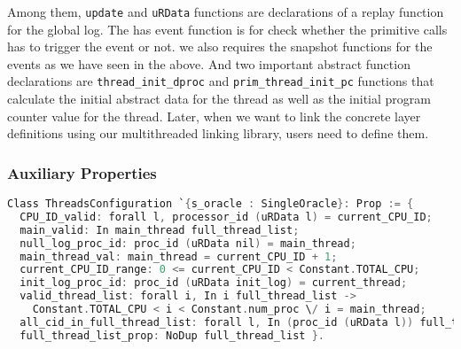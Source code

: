 Among them,  \lstinline$update$ and \lstinline$uRData$ functions are  declarations of a replay function for the global log. 
The has event function is for check whether the primitive calls has to trigger the event or not. 
we also requires the snapshot functions for the events as we have seen in the above.
And two important abstract function declarations 
are \lstinline$thread_init_dproc$ and \lstinline$prim_thread_init_pc$ functions 
that calculate the initial abstract data for the thread as well as the initial program counter value 
for the thread. 
Later, when we want to link the concrete layer definitions using our multithreaded linking library, users need to define them.

\subsubsection{Auxiliary Properties}


\begin{lstlisting}[language=C, morekeywords={Class}]
Class ThreadsConfiguration `{s_oracle : SingleOracle}: Prop := {
  CPU_ID_valid: forall l, processor_id (uRData l) = current_CPU_ID;
  main_valid: In main_thread full_thread_list;
  null_log_proc_id: proc_id (uRData nil) = main_thread;
  main_thread_val: main_thread = current_CPU_ID + 1;
  current_CPU_ID_range: 0 <= current_CPU_ID < Constant.TOTAL_CPU;
  init_log_proc_id: proc_id (uRData init_log) = current_thread;
  valid_thread_list: forall i, In i full_thread_list -> 
    Constant.TOTAL_CPU < i < Constant.num_proc \/ i = main_thread;
  all_cid_in_full_thread_list: forall l, In (proc_id (uRData l)) full_thread_list;
  full_thread_list_prop: NoDup full_thread_list }. 
\end{lstlisting}


